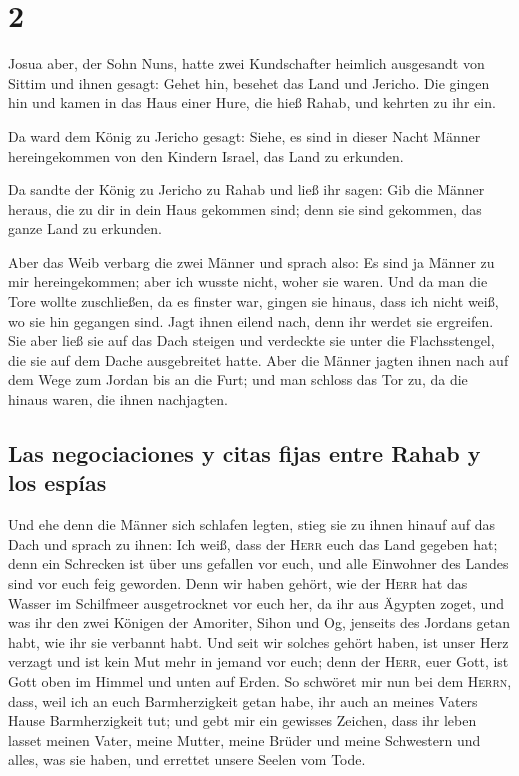 \hypertarget{section-1}{%
\section{2}\label{section-1}}

 Josua aber, der Sohn Nuns, hatte zwei Kundschafter
heimlich ausgesandt von Sittim und ihnen gesagt: Gehet hin, besehet das
Land und Jericho. Die gingen hin und kamen in das Haus einer Hure, die
hieß Rahab, und kehrten zu ihr ein.

 Da ward dem König zu Jericho gesagt: Siehe, es sind in
dieser Nacht Männer hereingekommen von den Kindern Israel, das Land zu
erkunden.

 Da sandte der König zu Jericho zu Rahab und ließ ihr
sagen: Gib die Männer heraus, die zu dir in dein Haus gekommen sind;
denn sie sind gekommen, das ganze Land zu erkunden.

 Aber das Weib verbarg die zwei Männer und sprach also: Es
sind ja Männer zu mir hereingekommen; aber ich wusste nicht, woher sie
waren.  Und da man die Tore wollte zuschließen, da es
finster war, gingen sie hinaus, dass ich nicht weiß, wo sie hin gegangen
sind. Jagt ihnen eilend nach, denn ihr werdet sie ergreifen.
 Sie aber ließ sie auf das Dach steigen und verdeckte sie
unter die Flachsstengel, die sie auf dem Dache ausgebreitet hatte.
 Aber die Männer jagten ihnen nach auf dem Wege zum Jordan
bis an die Furt; und man schloss das Tor zu, da die hinaus waren, die
ihnen nachjagten.

\hypertarget{las-negociaciones-y-citas-fijas-entre-rahab-y-los-espuxedas}{%
\subsection{Las negociaciones y citas fijas entre Rahab y los
espías}\label{las-negociaciones-y-citas-fijas-entre-rahab-y-los-espuxedas}}

 Und ehe denn die Männer sich schlafen legten, stieg sie
zu ihnen hinauf auf das Dach  und sprach zu ihnen: Ich
weiß, dass der \textsc{Herr} euch das Land gegeben hat; denn ein
Schrecken ist über uns gefallen vor euch, und alle Einwohner des Landes
sind vor euch feig geworden.  Denn wir haben gehört, wie
der \textsc{Herr} hat das Wasser im Schilfmeer ausgetrocknet vor euch
her, da ihr aus Ägypten zoget, und was ihr den zwei Königen der
Amoriter, Sihon und Og, jenseits des Jordans getan habt, wie ihr sie
verbannt habt.  Und seit wir solches gehört haben, ist
unser Herz verzagt und ist kein Mut mehr in jemand vor euch; denn der
\textsc{Herr}, euer Gott, ist Gott oben im Himmel und unten auf Erden.
 So schwöret mir nun bei dem \textsc{Herrn}, dass, weil
ich an euch Barmherzigkeit getan habe, ihr auch an meines Vaters Hause
Barmherzigkeit tut; und gebt mir ein gewisses Zeichen, 
dass ihr leben lasset meinen Vater, meine Mutter, meine Brüder und meine
Schwestern und alles, was sie haben, und errettet unsere Seelen vom
Tode.

